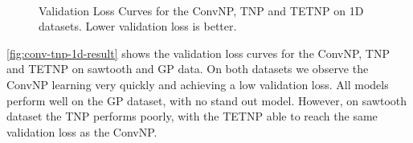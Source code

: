 \documentclass[../../main.tex]{subfiles}
\begin{document}
\begin{figure}[H]
	\centering
	\\
	\caption{Validation Loss Curves for the ConvNP, TNP and TETNP on 1D datasets. Lower validation loss is better.}
	\label{fig:conv-tnp-1d-result}
\end{figure}

\autoref{fig:conv-tnp-1d-result} shows the validation loss curves for the ConvNP, TNP and TETNP on sawtooth and GP data. On both datasets we observe the ConvNP learning very quickly and achieving a low validation loss. All models perform well on the GP dataset, with no stand out model. However, on sawtooth dataset the TNP performs poorly, with the TETNP able to reach the same validation loss as the ConvNP.
\end{document}
